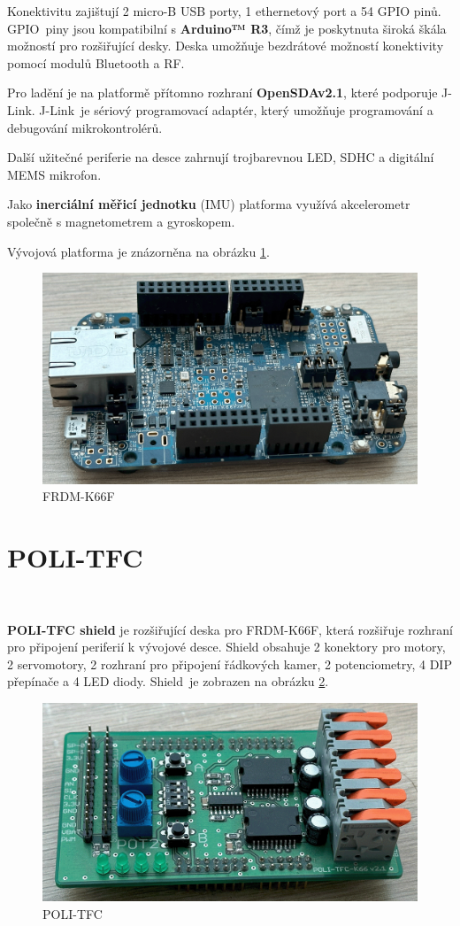 Konektivitu zajištují 2 micro-B USB porty, 1 ethernetový port a 54 GPIO pinů.
GPIO~piny jsou kompatibilní s \textbf{Arduino™ R3}, čímž je poskytnuta široká škála
možností pro rozšiřující desky. Deska umožňuje bezdrátové možností konektivity
pomocí modulů Bluetooth a RF.

Pro ladění je na platformě přítomno rozhraní \textbf{OpenSDAv2.1}, které podporuje
J-Link. J-Link~je sériový programovací adaptér, který umožňuje programování a
debugování mikrokontrolérů.

Další užitečné periferie na desce zahrnují trojbarevnou LED, SDHC a digitální MEMS
mikrofon.

Jako \textbf{inerciální měřicí jednotku} (IMU) platforma využívá akcelerometr
společně s magnetometrem a gyroskopem\cite{frdmk66UserGuide}.

Vývojová platforma je znázorněna na obrázku \ref{fig:FRDM-K66F}.
\begin{figure}[!h]
    \centering
    \includegraphics[width = .46\linewidth]{Figures/FRDM-K66F.png}
    \caption{FRDM-K66F}
    \label{fig:FRDM-K66F}
    \vspace{-20pt}
\end{figure}

\section{POLI-TFC}
\label{sec:POLI-TFC}\

\textbf{POLI-TFC shield} je rozšiřující deska pro FRDM-K66F, která rozšiřuje
rozhraní pro připojení periferií k vývojové desce. Shield obsahuje 2 konektory
pro motory, 2 servomotory, 2 rozhraní pro připojení řádkových kamer,
2 potenciometry, 4 DIP přepínače a 4 LED diody. Shield~je zobrazen na obrázku
\ref{fig:POLI-TFC}.
\begin{figure}[!h]
    \centering
    \includegraphics[width = .46\linewidth]{Figures/POLI-TFC.png}
    \caption{POLI-TFC}
    \label{fig:POLI-TFC}
    \vspace{-15pt}
\end{figure}
